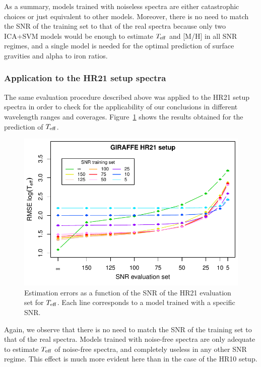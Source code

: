 \documentclass[a4paper,fleqn,usenatbib]{mnras}
\begin{document}
{{{As a summary, models trained with noiseless spectra are either 
catastrophic choices or just equivalent to other models. Moreover, 
there is no need to match the SNR of the training set to that of the 
real spectra because only two ICA+SVM models would be enough to 
estimate $T_{\rm eff}$ and [M/H] in all SNR regimes, and a single 
model is needed for the optimal prediction of surface gravities and 
alpha to iron ratios.

\subsubsection{Application to the HR21 setup spectra}

The same evaluation procedure described above was applied to the 
HR21 setup spectra in order to check for the applicability of our 
conclusions in different wavelength ranges and coverages. Figure~\ref{fig:snrtrainhr21} 
shows the results obtained for the prediction of $T_{\rm eff}$.

\begin{figure}
	\centering\includegraphics[width=\columnwidth]{snr_errors_log_global_HR21.pdf}
	\caption{Estimation errors as a function of the SNR of the HR21 evaluation 
		set for $T_{\rm eff}$. Each line corresponds 
		to a model trained with a specific SNR.}
	\label{fig:snrtrainhr21}
\end{figure}

Again, we observe that there is no need to match 
the SNR of the training set to that of the real spectra. Models 
trained with noise-free spectra are only adequate to 
estimate $T_{\rm eff}$ of noise-free spectra, and completely 
useless in any other SNR regime. This effect is much more evident 
here than in the case of the HR10 setup. 

}}}
\end{document}
